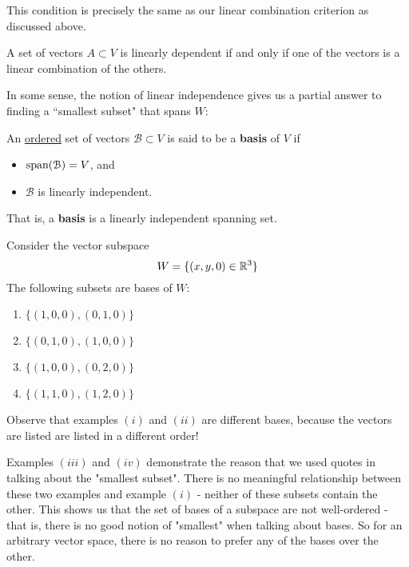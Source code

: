     This condition is precisely the same as our linear combination criterion as discussed above. 
    
    \begin{proposition}
     A set of vectors $A \subset V$ is linearly dependent if and only if one of the vectors is a linear combination of the others.
    \end{proposition}
    
    In some sense, the notion of linear independence gives us a partial answer to finding a ``smallest subset" that spans $W$:
    
    \begin{definition}
    An \underline{ordered} set of vectors $\mathcal{B} \subset V$ is said to be a \textbf{basis} of $V$ if 
     \begin{itemize}
        \item $\textnormal{span}(\mathcal{B}) = V$, and 
        \item $\mathcal{B}$ is linearly independent.
    \end{itemize}
    
    That is, a \textbf{basis} is a linearly independent spanning set.
    \end{definition}
    
    \begin{example}
    Consider the vector subspace $$W = \{(x, y, 0) \in \mathbb{R}^3 \}$$
    The following subsets are bases of $W$:
    
    \begin{enumerate}[label=(\roman*)]
        \item $\{(1,0,0), (0,1,0)\}$
        \item $\{(0,1,0), (1,0,0)\}$
        \item $\{(1,0,0),(0,2,0)\}$
        \item $\{(1,1,0),(1,2,0)\}$
    \end{enumerate}
    \end{example}
    
    Observe that examples $(i)$ and $(ii)$ are different bases, because the vectors are listed are listed in a different order!
    
    Examples $(iii)$ and $(iv)$ demonstrate the reason that we used quotes in talking about the "smallest subset".  There is no meaningful relationship between these two examples and example $(i)$ - neither of these subsets contain the other.  This shows us that the set of bases of a subspace are not well-ordered - that is, there is no good notion of "smallest" when talking about bases.  So for an arbitrary vector space, there is no reason to prefer any of the bases over the other.
    
